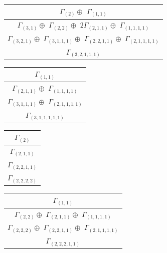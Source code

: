 \documentclass[main.tex]{subfiles}
\begin{document}
\bigskip
\begin{minipage}{.48\textwidth}
\centering
\begin{tabular}{c}
$\Gamma_{(
2
)} \oplus$
$\Gamma_{(
1 , 
1
)}$
\\ \hline
$\Gamma_{(
3 , 
1
)} \oplus$
$\Gamma_{(
2 , 
2
)} \oplus$
$2\Gamma_{(
2 , 
1 , 
1
)} \oplus$
$\Gamma_{(
1 , 
1 , 
1 , 
1
)}$
\\ \hline
$\Gamma_{(
3 , 
2 , 
1
)} \oplus$
$\Gamma_{(
3 , 
1 , 
1 , 
1
)} \oplus$
$\Gamma_{(
2 , 
2 , 
1 , 
1
)} \oplus$
$\Gamma_{(
2 , 
1 , 
1 , 
1 , 
1
)}$
\\ \hline
$\Gamma_{(
3 , 
2 , 
1 , 
1 , 
1
)}$
\\
\end{tabular}\end{minipage}
\begin{minipage}{.3\textwidth}
\centering
\begin{tabular}{c}
$\Gamma_{(
1 , 
1
)}$
\\ \hline
$\Gamma_{(
2 , 
1 , 
1
)} \oplus$
$\Gamma_{(
1 , 
1 , 
1 , 
1
)}$
\\ \hline
$\Gamma_{(
3 , 
1 , 
1 , 
1
)} \oplus$
$\Gamma_{(
2 , 
1 , 
1 , 
1 , 
1
)}$
\\ \hline
$\Gamma_{(
3 , 
1 , 
1 , 
1 , 
1 , 
1
)}$
\\
\end{tabular}\end{minipage}
\begin{minipage}{.2\textwidth}
\centering
\begin{tabular}{c}
$\Gamma_{(
2
)}$
\\ \hline
$\Gamma_{(
2 , 
1 , 
1
)}$
\\ \hline
$\Gamma_{(
2 , 
2 , 
1 , 
1
)}$
\\ \hline
$\Gamma_{(
2 , 
2 , 
2 , 
2
)}$
\\
\end{tabular}\end{minipage}
\bigskip
\begin{minipage}{.38\textwidth}
\centering
\begin{tabular}{c}
$\Gamma_{(
1 , 
1
)}$
\\ \hline
$\Gamma_{(
2 , 
2
)} \oplus$
$\Gamma_{(
2 , 
1 , 
1
)} \oplus$
$\Gamma_{(
1 , 
1 , 
1 , 
1
)}$
\\ \hline
$\Gamma_{(
2 , 
2 , 
2
)} \oplus$
$\Gamma_{(
2 , 
2 , 
1 , 
1
)} \oplus$
$\Gamma_{(
2 , 
1 , 
1 , 
1 , 
1
)}$
\\ \hline
$\Gamma_{(
2 , 
2 , 
2 , 
1 , 
1
)}$
\\
\end{tabular}\end{minipage}
\end{document}
